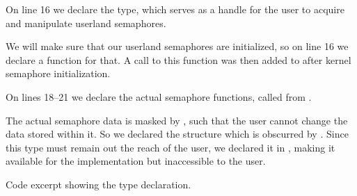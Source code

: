 On line 16 we declare the  type, which serves as a handle
for the user to acquire and manipulate userland semaphores.

We will make sure that our userland semaphores are initialized, so on line
16 we declare a function for that. A call to this function was then added to
 after kernel semaphore initialization.

On lines 18--21 we declare the actual semaphore functions, called from
.

The actual semaphore data is masked by , such that the user
cannot change the data stored within it. So we declared the structure
 which is obscurred by . Since this type must
remain out the reach of the user, we declared it in ,
making it available for the implementation but inaccessible to the user.

{Code excerpt showing the  type declaration.}

